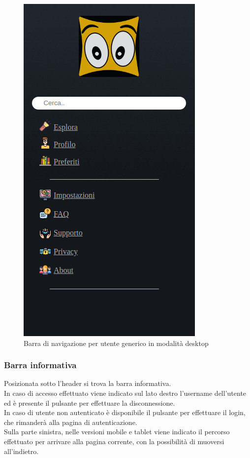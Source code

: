 \begin{figure}[h!]
	\centerline{\includegraphics[scale=0.45]{img/nav_bar.png}}
	\caption{Barra di navigazione per utente generico in modalità desktop}
	\label{fig:navbarGU}
\end{figure}

\subsubsection{Barra informativa}
Posizionata sotto l'header si trova la barra informativa.\\
In caso di accesso effettuato viene indicato sul lato destro l'username dell'utente ed è presente il pulsante per effettuare la disconnessione.\\
In caso di utente non autenticato è disponibile il pulsante per effettuare il login, che rimanderà alla pagina di autenticazione.\\
Sulla parte sinistra, nelle versioni mobile e tablet viene indicato il percorso effettuato per arrivare alla pagina corrente, con la possibilità di muoversi all'indietro. 

